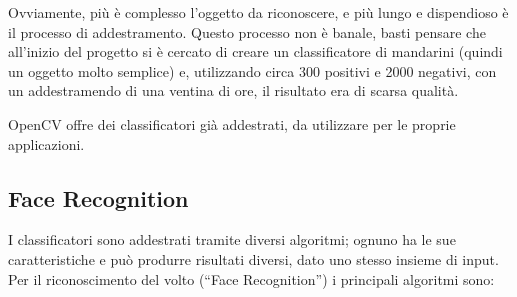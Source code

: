 Ovviamente, più è complesso l'oggetto da riconoscere, e più lungo e dispendioso è il processo di addestramento. Questo processo non è banale, basti pensare che all'inizio del progetto si è cercato di creare un classificatore di mandarini (quindi un oggetto molto semplice) e, utilizzando circa 300 positivi e 2000 negativi, con un addestramendo di una ventina di ore, il risultato era di scarsa qualità.

OpenCV offre dei classificatori già addestrati, da utilizzare per le proprie applicazioni.

\subsection{Face Recognition}
I classificatori sono addestrati tramite diversi algoritmi; ognuno ha le sue caratteristiche e può produrre risultati diversi, dato uno stesso insieme di input. Per il riconoscimento del volto (“Face Recognition”) i principali algoritmi sono:

